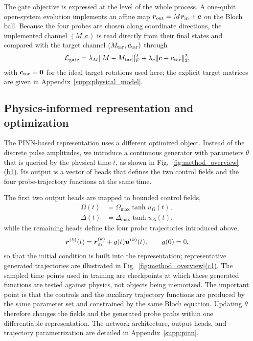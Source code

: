 \documentclass[aps,prx,reprint,superscriptaddress,nofootinbib,longbibliography,floatfix,showkeys]{revtex4-2}
\newcommand{\rr}{\bm r}
\newcommand{\rin}{\rr_{\rm in}}
\newcommand{\rout}{\rr_{\rm out}}
\newcommand{\Mtar}{M_{\rm tar}}
\newcommand{\ctar}{\bm c_{\rm tar}}
\newcommand{\Lgate}{\mathcal L_{\rm gate}}
\newcommand{\appsecref}[1]{Appendix~\hyperref[#1]{\ref*{#1}}}
\newcommand{\panref}[2]{\hyperlink{pan.#1.#2}{(#2)}}
\begin{document}
The gate objective is expressed at the level of the whole process.  A one-qubit open-system evolution implements an affine map $\rout=M\rin+\bm c$ on the Bloch ball.  Because the four probes are chosen along coordinate directions, the implemented channel $(M,\bm c)$ is read directly from their final states and compared with the target channel $(\Mtar,\ctar)$ through
\begin{equation}
    \Lgate=\lambda_M\|M-\Mtar\|_F^2+
    \lambda_c\|\bm c-\ctar\|_2^2,
    \label{eq:Lgate_main}
\end{equation}
with $\ctar=\bm 0$ for the ideal target rotations used here; the explicit target matrices are given in \appsecref{supp:physical_model}.

\subsection{Physics-informed representation and optimization}

The PINN-based representation uses a different optimized object.  Instead of the discrete pulse amplitudes, we introduce a continuous generator with parameters $\theta$ that is queried by the physical time $t$, as shown in Fig.~\ref{fig:method_overview}\panref{fig.method_overview}{b1}.  Its output is a vector of heads that defines the two control fields and the four probe-trajectory functions at the same time.

The first two output heads are mapped to bounded control fields,
\begin{align}
    \Omega(t)&=\Omega_{\max}\tanh u_\Omega(t),\\
    \Delta(t)&=\Delta_{\max}\tanh u_\Delta(t),
    \label{eq:control_param_main}
\end{align}
while the remaining heads define the four probe trajectories introduced above,
\begin{equation}
    \rr^{(k)}(t)=\rr_{\rm in}^{(k)}+g(t)\bm u^{(k)}(t),
    \qquad g(0)=0 ,
    \label{eq:traj_param_main}
\end{equation}
so that the initial condition is built into the representation; representative generated trajectories are illustrated in Fig.~\ref{fig:method_overview}\panref{fig.method_overview}{c1}.  The sampled time points used in training are checkpoints at which these generated functions are tested against physics, not objects being memorized.  The important point is that the controls and the auxiliary trajectory functions are produced by the same parameter set and constrained by the same Bloch equation.  Updating $\theta$ therefore changes the fields and the generated probe paths within one differentiable representation.  The network architecture, output heads, and trajectory parametrization are detailed in \appsecref{supp:pinn}.
\end{document}
